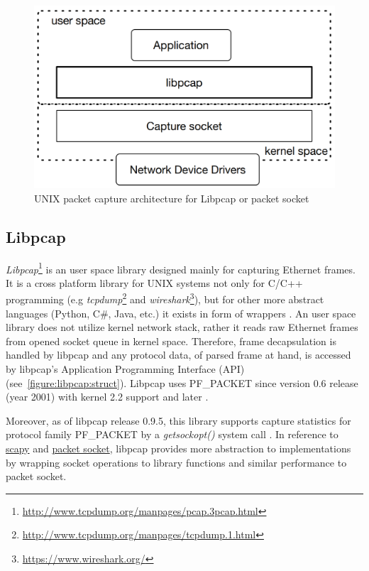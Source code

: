 \documentclass[12pt,a4paper,twoside]{report}
\begin{document}
			\begin{figure}[h]
				\centering
				\includegraphics[scale=0.27]{linux_net_capture_struct}
				\caption{UNIX packet capture architecture for Libpcap or packet socket}
				\label{figure:libpcap:struct}
			\end{figure}
		\subsection{Libpcap} \label{analysis:mechs:libpcap}
			\emph{Libpcap}\footnote{\url{http://www.tcpdump.org/manpages/pcap.3pcap.html}} is an user space library designed mainly for capturing Ethernet frames. It is a cross platform library for UNIX systems not only for C/C++ programming (e.g \emph{tcpdump}\footnote{\url{http://www.tcpdump.org/manpages/tcpdump.1.html}} and \emph{wireshark}\footnote{\url{https://www.wireshark.org/}}), but for other more abstract languages (Python, C\#, Java, etc.) it exists in form of wrappers \cite{article:libpcap}. An user space library does not utilize kernel network stack, rather it reads raw Ethernet frames from opened socket queue in kernel space. Therefore, frame decapsulation is handled by libpcap and any protocol data, of parsed frame at hand, is accessed by libpcap's Application Programming Interface (API) (see~\autoref{figure:libpcap:struct}). Libpcap uses PF\_PACKET \cite{presentation:socket} \cite{report:libpcap} since version 0.6 release (year 2001) with kernel 2.2 support and later \cite{git:libpcap0.6:changes}.\par
			Moreover, as of libpcap release 0.9.5, this library supports capture statistics for protocol family PF\_PACKET by a \emph{getsockopt()} system call \cite{git:libpcap0.9:changes}. In reference to \hyperref[analysis:mechs:scapy_rss]{scapy} and \hyperref[analysis:mechs:socket]{packet socket}, libpcap provides more abstraction to implementations by wrapping socket operations to library functions and similar performance to packet socket.
\end{document}
